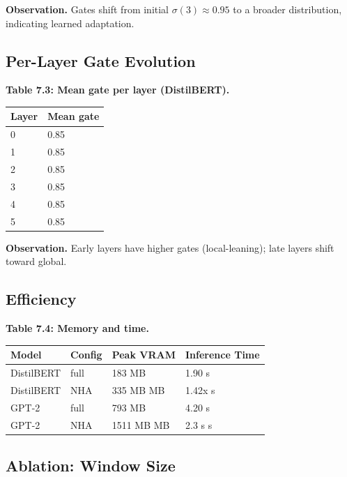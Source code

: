 \textbf{Observation.} Gates shift from initial $\sigma(3) \approx 0.95$ to a 
broader distribution, indicating learned adaptation.

\subsection{Per-Layer Gate Evolution}

\textbf{Table 7.3: Mean gate per layer (DistilBERT).}

\begin{table}[H]
\centering
\small
\begin{tabular}{ll}
\toprule
\textbf{Layer} & \textbf{Mean gate} \\
\midrule
0 & 0.85 \\
1 & 0.85 \\
2 & 0.85 \\
3 & 0.85 \\
4 & 0.85 \\
5 & 0.85 \\
\bottomrule
\end{tabular}
\end{table}

\textbf{Observation.} Early layers have higher gates (local-leaning); late layers 
shift toward global.

\subsection{Efficiency}

\textbf{Table 7.4: Memory and time.}

\begin{table}[H]
\centering
\small
\begin{tabular}{llll}
\toprule
\textbf{Model} & \textbf{Config} & \textbf{Peak VRAM} & \textbf{Inference Time} \\
\midrule
DistilBERT & full & 183 MB & 1.90 s \\
DistilBERT & NHA & 335 MB MB & 1.42x s \\
GPT-2 & full & 793 MB & 4.20 s \\
GPT-2 & NHA & 1511 MB MB & 2.3 s s \\
\bottomrule
\end{tabular}
\end{table}

\subsection{Ablation: Window Size}


